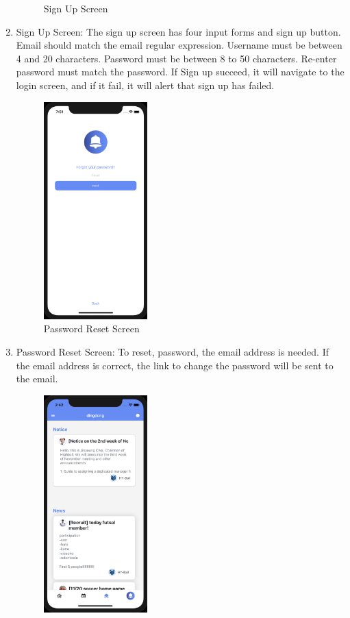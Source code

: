 \documentclass[conference]{IEEEtran}
\begin{document}
\begin{enumerate}
\begin{figure}[h]
        \caption{Sign Up Screen}
        \label{fig:my_label}
    \end{figure}
    \item Sign Up Screen: The sign up screen has four input forms and sign up button. Email should match the email regular expression. Username must be between 4 and 20 characters. Password must be between 8 to 50 characters. Re-enter password must match the password. If Sign up succeed, it will navigate to the login screen, and if it fail, it will alert that sign up has failed.
    \begin{figure}[h]
        \centering
        \includegraphics[width=4cm]{images/passwordreset.png}
        \caption{Password Reset Screen}
        \label{fig:my_label}
    \end{figure}
    \item Password Reset Screen: To reset, password, the email address is needed. If the email address is correct, the link to change the password will be sent to the email.
    \begin{figure}[h]
        \centering
        \includegraphics[width=4cm]{images/home.png}

\end{figure}
\end{enumerate}
\end{document}
